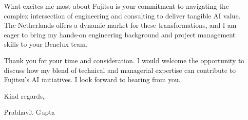 \documentclass[11pt,a4paper]{article}
\begin{document}
What excites me most about Fujitsu is your commitment to navigating the complex intersection of engineering and consulting to deliver tangible AI value. The Netherlands offers a dynamic market for these transformations, and I am eager to bring my hands-on engineering background and project management skills to your Benelux team.

Thank you for your time and consideration. I would welcome the opportunity to discuss how my blend of technical and managerial expertise can contribute to Fujitsu's AI initiatives. I look forward to hearing from you.

\vspace{1em}

Kind regards,

\vspace{2em}

Prabhavit Gupta
\end{document}
